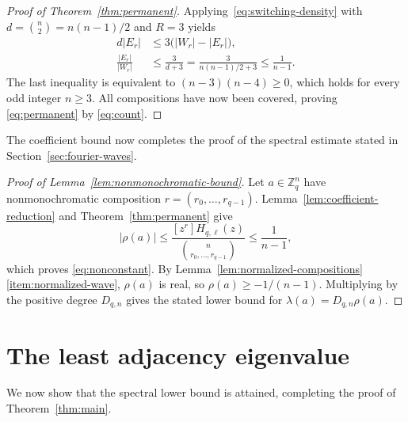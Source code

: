 \documentclass[11pt,a4paper]{article}
\numberwithin{equation}{section}
\numberwithin{figure}{section}
\numberwithin{table}{section}
\numberwithin{footnote}{section}
\theoremstyle{informal}\newtheorem*{informaltheorem}{Informal theorem}
\theoremstyle{definition}\newtheorem{example}{Example}[section]
\theoremstyle{remark}\newtheorem{remark}[theorem]{Remark}
\newcommand{\Z}{\mathbb Z}
\newcommand{\mult}[2]{\binom{#1}{#2}}
\begin{document}
\begin{proof}[Proof of Theorem~\ref{thm:permanent}]
Applying~\eqref{eq:switching-density} with
\(d=\binom n2=n(n-1)/2\) and \(R=3\) yields
\begin{equation}\label{eq:three}
 \begin{aligned}
 d|E_r|&\leq3\bigl(|W_r|-|E_r|\bigr),\\
 \frac{|E_r|}{|W_r|}
 &\leq\frac3{d+3}
 =\frac3{n(n-1)/2+3}\leq\frac1{n-1}.
 \end{aligned}
\end{equation}
The last inequality is equivalent to
\((n-3)(n-4)\geq0\), which holds for every odd integer \(n\geq3\).
All compositions have now been covered, proving
\eqref{eq:permanent} by \eqref{eq:count}.
\end{proof}

The coefficient bound now completes the proof of the spectral
estimate stated in Section~\ref{sec:fourier-waves}.

\begin{proof}[Proof of Lemma~\ref{lem:nonmonochromatic-bound}]
Let \(a\in\Z_q^n\) have nonmonochromatic composition
\(r=(r_0,\ldots,r_{q-1})\). Lemma~\ref{lem:coefficient-reduction}
and Theorem~\ref{thm:permanent} give
\begin{equation}
 |\rho(a)|\leq
 \frac{[z^r]H_{q,\ell}(z)}{\mult n{r_0,\ldots,r_{q-1}}}
 \leq\frac1{n-1},
\end{equation}
which proves \eqref{eq:nonconstant}.
By Lemma~\ref{lem:normalized-compositions}\,\ref{item:normalized-wave},
\(\rho(a)\) is real, so \(\rho(a)\geq-1/(n-1)\).
Multiplying by the positive degree \(D_{q,n}\) gives the stated
lower bound for \(\lambda(a)=D_{q,n}\rho(a)\).
\end{proof}

\section{The least adjacency eigenvalue}\label{sec:spectral}
We now show that the spectral lower bound is attained, completing
the proof of Theorem~\ref{thm:main}.
\end{document}
